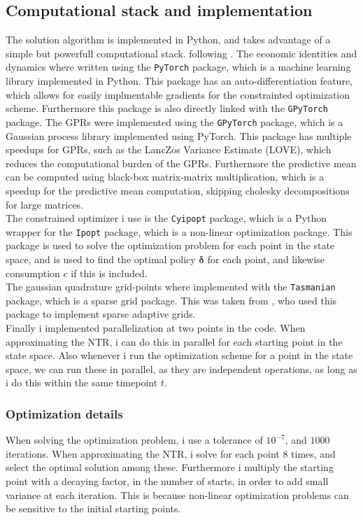 \documentclass[11pt]{article}
\begin{document}
\subsection{Computational stack and implementation} \label{Subsection: Computational_stack}
The solution algorithm is implemented in Python, and takes advantage of a simple but powerfull computational stack. following \autocite{Scheidegger2023}.
The economic identities and dynamics where written using the \texttt{PyTorch} package, which is a machine learning library implemented in Python.
This package has an auto-differentiation feature, which allows for easily implmentable gradients for the constrainted optimization scheme.
Furthermore this package is also directly linked with the \texttt{GPyTorch} package.
The \ac{GPR}s were implemented using the \texttt{GPyTorch} package, which is a Gaussian process library implemented using PyTorch.
This package has multiple speedups for \ac{GPR}s, such as the LancZos Variance Estimate (LOVE), which reduces the computational burden of the \ac{GPR}s.
Furthermore the predictive mean can be computed using black-box matrix-matrix multiplication, which is a speedup for the predictive mean computation,
skipping cholesky decompositions for large matrices.\\
The constrained optimizer i use is the \texttt{Cyipopt} package, which is a Python wrapper for the \texttt{Ipopt} package, which is a non-linear optimization package.
This package is used to solve the optimization problem for each point in the state space, and is used to find the optimal policy $\boldsymbol{\delta}$ for each point, and likewise consumption $c$ if this is included.\\
The gaussian quadrature grid-points where implemented with the \texttt{Tasmanian} package, which is a sparse grid package.
This was taken from \autocite{Schober2022}, who used this package to implement sparse adaptive grids.\\
Finally i implemented parallelization at two points in the code. 
When approximating the \ac{NTR}, i can do this in parallel for each starting point in the state space.
Also whenever i run the optimization scheme for a point in the state space, we can run these in parallel,
as they are independent operations, as long as i do this within the same timepoint $t$.

\subsubsection{Optimization details} \label{Subsubsection: optimization_details}
When solving the optimization problem, i use a tolerance of $10^{-7}$, and $1000$ iterations.
When approximating the \ac{NTR}, i solve for each point $8$ times, and select the optimal solution among these.
Furthermore i multiply the starting point with a decaying factor, in the number of starts,
in order to add small variance at each iteration. This is because non-linear optimization problems can be
sensitive to the initial starting points.
\end{document}
